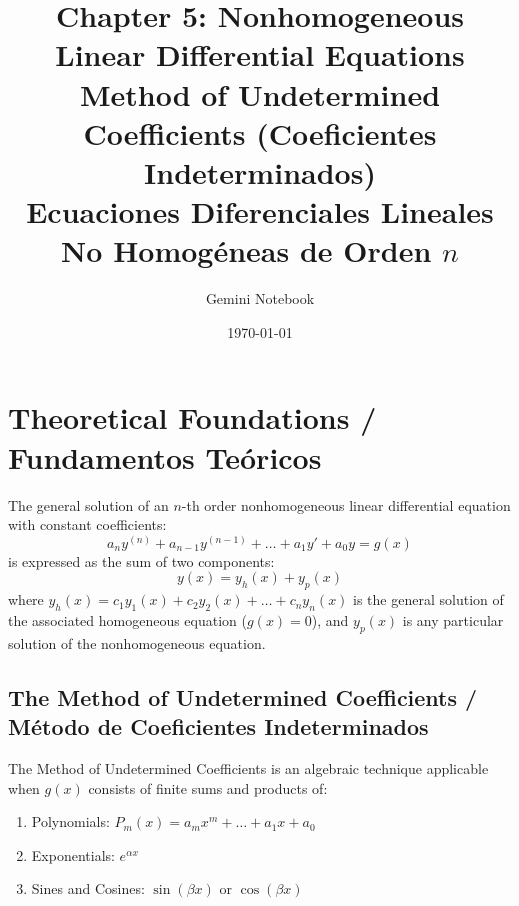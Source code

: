 \documentclass[11pt,letterpaper]{article}
\title{\textbf{Chapter 5: Nonhomogeneous Linear Differential Equations}\\
\large Method of Undetermined Coefficients (Coeficientes Indeterminados)\\
\normalsize Ecuaciones Diferenciales Lineales No Homogéneas de Orden $n$}
\author{Gemini Notebook}
\date{\today}
\begin{document}
\maketitle

\section{Theoretical Foundations / Fundamentos Teóricos}

The general solution of an $n$-th order nonhomogeneous linear differential equation with constant coefficients:
\begin{equation}
    a_n y^{(n)} + a_{n-1} y^{(n-1)} + \dots + a_1 y' + a_0 y = g(x)
\end{equation}
is expressed as the sum of two components:
\begin{equation}
    y(x) = y_h(x) + y_p(x)
\end{equation}
where $y_h(x) = c_1 y_1(x) + c_2 y_2(x) + \dots + c_n y_n(x)$ is the general solution of the associated homogeneous equation ($g(x) = 0$), and $y_p(x)$ is any particular solution of the nonhomogeneous equation.

\subsection{The Method of Undetermined Coefficients / Método de Coeficientes Indeterminados}

The Method of Undetermined Coefficients is an algebraic technique applicable when $g(x)$ consists of finite sums and products of:
\begin{enumerate}
    \item Polynomials: $P_m(x) = a_m x^m + \dots + a_1 x + a_0$
    \item Exponentials: $e^{\alpha x}$
    \item Sines and Cosines: $\sin(\beta x)$ or $\cos(\beta x)$
\end{enumerate}
\end{document}
